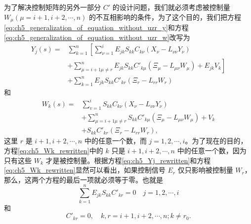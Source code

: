 为了解决控制矩阵的另外一部分 $C'$ 的设计问题，我们就必须考虑被控制量 $W_{\mu}(\mu=i+1,i+2,\cdots,n)$ 的不互相影响的条件，为了这个目的，我们把方程\eqref{eq:ch5_generalization_of_equation_without_uzr_y}和方程\eqref{eq:ch5_generalization_of_equation_without_uzr_w}改写为
\begin{equation}\label{eq:ch5_Yj_rewritten}
\begin{array}{ll}
Y_j(s) = &\sum_{k=1}^{n} \left[ \sum_{\nu=1}^{i} E_{jk} S_{kk} C_{k\nu}(X_\nu - L_{\nu\nu} Y_\nu)\right.\\
		& \left.+ \sum_{\mu=i+1 \mu\neq r}^{n} E_{jk} S_{kk} C'_{k\mu} (\Xi_{\mu} - L_{\mu \nu} W_{\mu}) + E_{jk} V_k\right]\\
		& + \sum_{k=1}^{n} E_{jk} S_{kk} C'_{kr} (\Xi_r - L_{rr} W_r)
\end{array}
\end{equation}
和
\begin{equation}\label{eq:ch5_Wk_rewritten}
\begin{array}{ll}
W_k(s) = & \sum_{v=1}^{i} S_{kk} C_{k\nu} (X_\nu - L_{\nu\nu} Y_\nu)\\
		 & + \sum_{\mu=i+1 \mu \neq r}^{n} S_{kk} C'_{k\mu} (\Xi_\mu - L_{\mu \nu} W_\mu) + V_k\\
		 & + S_{kk} C'_{kr} (\Xi_r - L_{rr} W_r),
\end{array}
\end{equation}
这里 $r$ 是 $i+1, i+2, \cdots, n$ 中的任意一个数，而 $j=1, 2, \cdots, i$。为了现在的目的，方程\eqref{eq:ch5_Wk_rewritten}中的 $k$ 只是 $i+1, i+2, \cdots, n$ 中的任意一个数，因为只有这些 $W_k$ 才是被控制量。根据方程\eqref{eq:ch5_Yj_rewritten}和方程\eqref{eq:ch5_Wk_rewritten}显然可以看出，如果控制信号 $E_r$ 仅只影响被控制量 $W_r$，那么，这两个方程的最后一项就必须等于零。也就是
\begin{equation}\label{eq:ch5_control_signal_zero}
\sum_{k=1}^{n} E_{jk} S_{kk} C'_{kr} = 0 \quad j=1, 2, \cdots, i
\end{equation}
和
\begin{equation}\label{eq:ch5_control_matrix_zero}
C'_{kr} = 0, \quad k, r = i+1, i+2, \cdots, n; k \neq r_0.
\end{equation}

